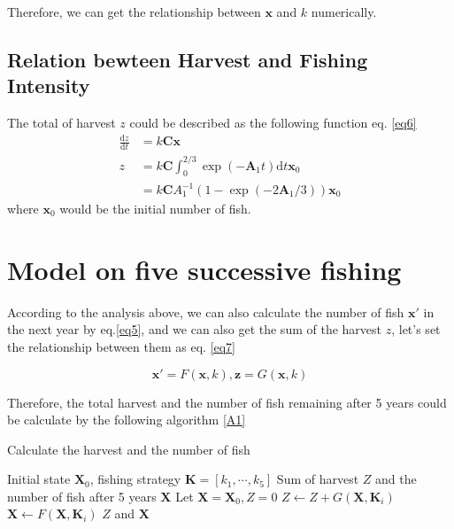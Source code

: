 \documentclass{IEEEtran}
\begin{document}
Therefore, we can get the relationship between $\bm x$ and $k$ numerically.
\subsection{Relation bewteen Harvest and Fishing Intensity}
The total of harvest $z$ could be described as the following function eq. \ref{eq6}
\begin{align}
    \label{eq6}
    \frac {\mathrm dz}{\mathrm dt} &= k\pmb C \bm x\\
    z &= k\pmb C\int_0^{2/3}\exp(-\pmb A_1t)\mathrm dt\bm x_0 \\ 
    &= k\pmb C  A_1^{-1} (1-\exp(-2\pmb A_1/3))\bm x_0
\end{align}
where $\bm x_0$ would be the initial number of fish.


%
%
\section{Model on five successive fishing}\label{model2}

According to the analysis above, we can also calculate the number of fish $\bm x'$ in the next year by eq.\ref{eq5}, and we can also get the sum of the harvest $z$, let's set the relationship between them as eq. \ref{eq7}

\begin{equation}
    \label{eq7}
    \bm x' = F(\bm x, k), \bm z = G(\bm x,k)
\end{equation}

Therefore, the total harvest and the number of fish remaining after 5 years could be calculate by the following algorithm \ref{A1}

\begin{algorithm}[h]
    \caption{Calculate the harvest and the number of fish}\label{A1}
    \begin{algorithmic}
        \Require Initial state $\bm X_0$, fishing strategy $\bm K = [k_1,\cdots,k_5]$ 
        \Ensure Sum of harvest $Z$ and the number of fish after 5 years $\bm X$
        \State Let $\bm X = \bm X_0, Z = 0$
        \State $Z \leftarrow Z + G(\bm X,\bm K_i)$
        \State $\bm X \leftarrow F(\bm X, \bm K_i)$
        \EndFor
    \State \Return $Z$ and $\bm X$
    \end{algorithmic}
\end{algorithm}
\end{document}

